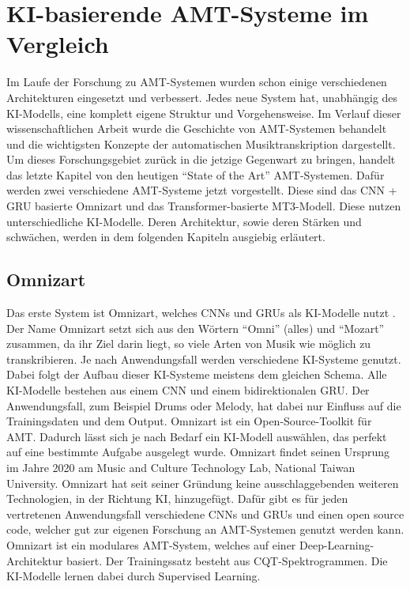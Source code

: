 \usepackage{csquotes}\section{KI-basierende AMT-Systeme im Vergleich}
Im Laufe der Forschung zu AMT-Systemen wurden schon einige verschiedenen Architekturen eingesetzt und verbessert.
Jedes neue System hat, unabhängig des KI-Modells, eine komplett eigene Struktur und Vorgehensweise.
Im Verlauf dieser wissenschaftlichen Arbeit wurde die Geschichte von AMT-Systemen behandelt
und die wichtigsten Konzepte der automatischen Musiktranskription dargestellt.
Um dieses Forschungsgebiet zurück in die jetzige Gegenwart zu bringen,
handelt das letzte Kapitel von den heutigen \enquote{State of the Art} AMT-Systemen.
Dafür werden zwei verschiedene AMT-Systeme jetzt vorgestellt.
Diese sind das CNN + GRU basierte Omnizart und das Transformer-basierte MT3-Modell.
Diese nutzen unterschiedliche KI-Modelle.
Deren Architektur, sowie deren Stärken und schwächen, werden in dem folgenden Kapiteln ausgiebig erläutert.

\subsection{Omnizart}
Das erste System ist Omnizart, welches CNNs und GRUs als KI-Modelle nutzt \cite{wu2021omnizart}.
Der Name Omnizart setzt sich aus den Wörtern \enquote{Omni} (alles) und \enquote{Mozart} zusammen,
da ihr Ziel darin liegt, so viele Arten von Musik wie möglich zu transkribieren.
Je nach Anwendungsfall werden verschiedene KI-Systeme genutzt.
Dabei folgt der Aufbau dieser KI-Systeme meistens dem gleichen Schema.
Alle KI-Modelle bestehen aus einem CNN und einem bidirektionalen GRU.
Der Anwendungsfall, zum Beispiel Drums oder Melody, hat dabei nur Einfluss auf die Trainingsdaten und dem Output.
Omnizart ist ein Open-Source-Toolkit für AMT.
Dadurch lässt sich je nach Bedarf ein KI-Modell auswählen, das perfekt auf eine bestimmte Aufgabe ausgelegt wurde.
Omnizart findet seinen Ursprung im Jahre 2020 am Music and Culture Technology Lab, National Taiwan University.
Omnizart hat seit seiner Gründung keine ausschlaggebenden weiteren Technologien, in der Richtung KI, hinzugefügt.
Dafür gibt es für jeden vertretenen Anwendungsfall verschiedene CNNs und GRUs und einen open source code,
welcher gut zur eigenen Forschung an AMT-Systemen genutzt werden kann.
Omnizart ist ein modulares AMT-System, welches auf einer Deep-Learning-Architektur basiert.
Der Trainingssatz besteht aus CQT-Spektrogrammen.
Die KI-Modelle lernen dabei durch Supervised Learning.

